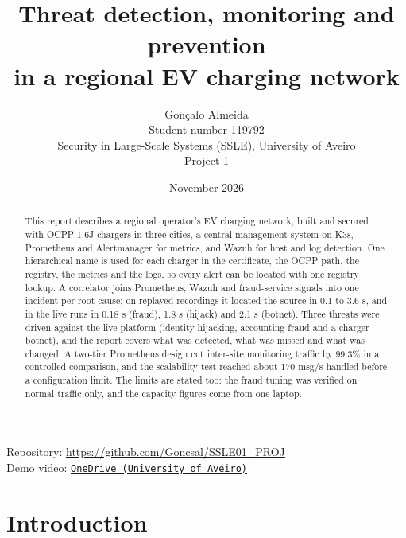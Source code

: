 \documentclass[a4paper,11pt]{article}
\title{\textsf{\textbf{Threat detection, monitoring and prevention\\in a regional EV charging network}}}
\author{Gonçalo Almeida\\[0.3em]
\normalsize Student number 119792\\[0.3em]
\normalsize Security in Large-Scale Systems (SSLE), University of Aveiro\\
\normalsize Project 1}
\date{November 2026}
\numberwithin{table}{section}
\begin{document}
\maketitle

\begin{center}
\vspace{-1.2em}
\small
Repository: \url{https://github.com/Goncsal/SSLE01_PROJ}\\[0.2em]
Demo video: \href{https://uapt33090-my.sharepoint.com/:v:/g/personal/goncalodfalmeida_ua_pt/IQBExnwRdGevTIi2LVAmXkUnAfzkqOxSE-DIBNSIEXwX7nc?nav=eyJyZWZlcnJhbEluZm8iOnsicmVmZXJyYWxBcHAiOiJPbmVEcml2ZUZvckJ1c2luZXNzIiwicmVmZXJyYWxBcHBQbGF0Zm9ybSI6IldlYiIsInJlZmVycmFsTW9kZSI6InZpZXciLCJyZWZlcnJhbFZpZXciOiJNeUZpbGVzTGlua0NvcHkifX0&e=3KdSai}{\texttt{OneDrive (University of Aveiro)}}
\end{center}

\begin{abstract}
\noindent This report describes a regional operator's EV charging network, built and secured with OCPP 1.6J chargers in three cities, a central management system on K3s, Prometheus and Alertmanager for metrics, and Wazuh for host and log detection. One hierarchical name is used for each charger in the certificate, the OCPP path, the registry, the metrics and the logs, so every alert can be located with one registry lookup. A correlator joins Prometheus, Wazuh and fraud-service signals into one incident per root cause; on replayed recordings it located the source in 0.1 to 3.6 s, and in the live runs in 0.18 s (fraud), 1.8 s (hijack) and 2.1 s (botnet). Three threats were driven against the live platform (identity hijacking, accounting fraud and a charger botnet), and the report covers what was detected, what was missed and what was changed. A two-tier Prometheus design cut inter-site monitoring traffic by 99.3\% in a controlled comparison, and the scalability test reached about 170 msg/s handled before a configuration limit. The limits are stated too: the fraud tuning was verified on normal traffic only, and the capacity figures come from one laptop.
\end{abstract}

\tableofcontents
\clearpage

\section{Introduction}
\end{document}
